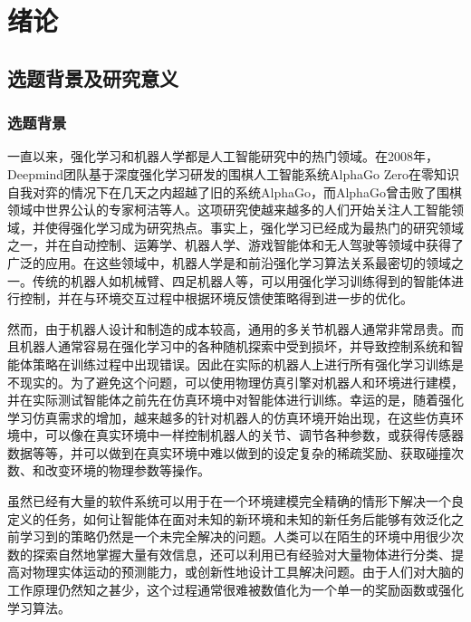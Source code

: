 \chapter{绪论}

    \section{选题背景及研究意义}
    
        \subsection{选题背景}
        一直以来，强化学习和机器人学都是人工智能研究中的热门领域。在2008年，Deepmind团队基于深度强化学习研发的围棋人工智能系统AlphaGo Zero在零知识自我对弈的情况下在几天之内超越了旧的系统AlphaGo，而AlphaGo曾击败了围棋领域中世界公认的专家柯洁等人\cite{silver2018a}。这项研究使越来越多的人们开始关注人工智能领域，并使得强化学习成为研究热点。事实上，强化学习已经成为最热门的研究领域之一，并在自动控制、运筹学、机器人学、游戏智能体和无人驾驶等领域中获得了广泛的应用\cite{dosovitskiy2017carla}。在这些领域中，机器人学是和前沿强化学习算法关系最密切的领域之一。传统的机器人如机械臂、四足机器人等，可以用强化学习训练得到的智能体进行控制，并在与环境交互过程中根据环境反馈使策略得到进一步的优化。

        然而，由于机器人设计和制造的成本较高，通用的多关节机器人通常非常昂贵。而且机器人通常容易在强化学习中的各种随机探索中受到损坏，并导致控制系统和智能体策略在训练过程中出现错误。因此在实际的机器人上进行所有强化学习训练是不现实的\cite{toussaint2018differentiable, todorov2012mujoco}。为了避免这个问题，可以使用物理仿真引擎对机器人和环境进行建模，并在实际测试智能体之前先在仿真环境中对智能体进行训练。幸运的是，随着强化学习仿真需求的增加，越来越多的针对机器人的仿真环境开始出现，在这些仿真环境中，可以像在真实环境中一样控制机器人的关节、调节各种参数，或获得传感器数据等等，并可以做到在真实环境中难以做到的设定复杂的稀疏奖励、获取碰撞次数、和改变环境的物理参数等操作\cite{savva2019habitat}。

        虽然已经有大量的软件系统可以用于在一个环境建模完全精确的情形下解决一个良定义的任务\cite{toussaint2018differentiable}，如何让智能体在面对未知的新环境和未知的新任务后能够有效泛化之前学习到的策略仍然是一个未完全解决的问题。人类可以在陌生的环境中用很少次数的探索自然地掌握大量有效信息，还可以利用已有经验对大量物体进行分类、提高对物理实体运动的预测能力，或创新性地设计工具解决问题。由于人们对大脑的工作原理仍然知之甚少，这个过程通常很难被数值化为一个单一的奖励函数或强化学习算法。

